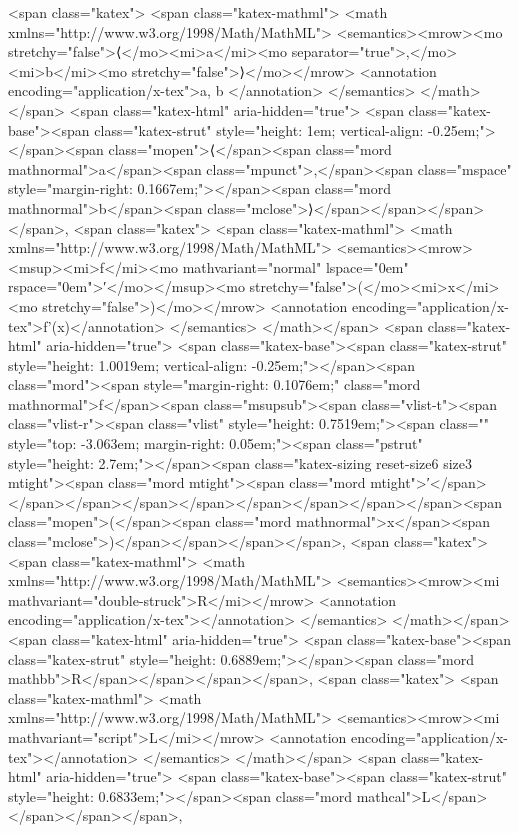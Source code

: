 <span class="katex">
<span class="katex-mathml">
<math xmlns="http://www.w3.org/1998/Math/MathML">
<semantics><mrow><mo stretchy="false">⟨</mo><mi>a</mi><mo separator="true">,</mo><mi>b</mi><mo stretchy="false">⟩</mo></mrow>
<annotation encoding="application/x-tex">\langle a, b \rangle</annotation>
</semantics>
</math></span>
<span class="katex-html" aria-hidden="true">
<span class="katex-base"><span class="katex-strut" style="height: 1em; vertical-align: -0.25em;"></span><span class="mopen">⟨</span><span class="mord mathnormal">a</span><span class="mpunct">,</span><span class="mspace" style="margin-right: 0.1667em;"></span><span class="mord mathnormal">b</span><span class="mclose">⟩</span></span></span></span>, 
<span class="katex">
<span class="katex-mathml">
<math xmlns="http://www.w3.org/1998/Math/MathML">
<semantics><mrow><msup><mi>f</mi><mo mathvariant="normal" lspace="0em" rspace="0em">′</mo></msup><mo stretchy="false">(</mo><mi>x</mi><mo stretchy="false">)</mo></mrow>
<annotation encoding="application/x-tex">f'(x)</annotation>
</semantics>
</math></span>
<span class="katex-html" aria-hidden="true">
<span class="katex-base"><span class="katex-strut" style="height: 1.0019em; vertical-align: -0.25em;"></span><span class="mord"><span style="margin-right: 0.1076em;" class="mord mathnormal">f</span><span class="msupsub"><span class="vlist-t"><span class="vlist-r"><span class="vlist" style="height: 0.7519em;"><span class="" style="top: -3.063em; margin-right: 0.05em;"><span class="pstrut" style="height: 2.7em;"></span><span class="katex-sizing reset-size6 size3 mtight"><span class="mord mtight"><span class="mord mtight">′</span></span></span></span></span></span></span></span></span><span class="mopen">(</span><span class="mord mathnormal">x</span><span class="mclose">)</span></span></span></span>, 
<span class="katex">
<span class="katex-mathml">
<math xmlns="http://www.w3.org/1998/Math/MathML">
<semantics><mrow><mi mathvariant="double-struck">R</mi></mrow>
<annotation encoding="application/x-tex"></annotation>
</semantics>
</math></span>
<span class="katex-html" aria-hidden="true">
<span class="katex-base"><span class="katex-strut" style="height: 0.6889em;"></span><span class="mord mathbb">R</span></span></span></span>, 
<span class="katex">
<span class="katex-mathml">
<math xmlns="http://www.w3.org/1998/Math/MathML">
<semantics><mrow><mi mathvariant="script">L</mi></mrow>
<annotation encoding="application/x-tex"></annotation>
</semantics>
</math></span>
<span class="katex-html" aria-hidden="true">
<span class="katex-base"><span class="katex-strut" style="height: 0.6833em;"></span><span class="mord mathcal">L</span></span></span></span>, 
